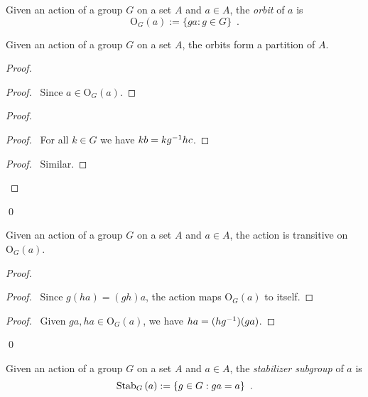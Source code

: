 \begin{df}[Orbit]
Given an action of a group $G$ on a set $A$ and $a \in A$, the \emph{orbit} of $a$ is
\[ \mathrm{O}_G(a) := \{ ga : g \in G \} \enspace . \]
\end{df}

\begin{prop}
Given an action of a group $G$ on a set $A$, the orbits form a partition of $A$.
\end{prop}

\begin{proof}
\pf
{}
\begin{proof}
\pf\ Since $a \in \mathrm{O}_G(a)$.
\end{proof}
\begin{proof}
\begin{proof}
\pf\ For all $k \in G$ we have $kb = k{g}^{-1}hc$.
\end{proof}
\begin{proof}
\pf\ Similar.
\end{proof}
\end{proof}
\qed
\end{proof}

\begin{prop}
Given an action of a group $G$ on a set $A$ and $a \in A$, the action is transitive on $\mathrm{O}_G(a)$.
\end{prop}

\begin{proof}
\pf
{}
\begin{proof}
\pf\ Since $g(ha) = (gh)a$, the action maps $\mathrm{O}_G(a)$ to itself.
\end{proof}
\begin{proof}
\pf\ Given $ga, ha \in \mathrm{O}_G(a)$, we have $ha = (h{g}^{-1})(ga)$.
\end{proof}
\qed
\end{proof}

\begin{df}
Given an action of a group $G$ on a set $A$ and $a \in A$, the \emph{stabilizer subgroup} of $a$ is
\[ \mathrm{Stab}_{G} \left( {a} \right) := \{ g \in G : ga = a \} \enspace . \]
\end{df}

